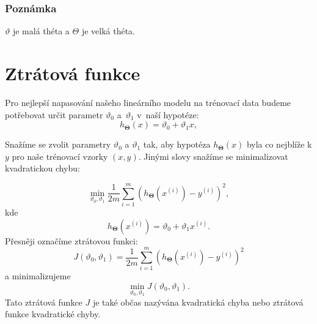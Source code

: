 \subsubsection*{Poznámka}
\par{$\vartheta$ je malá théta a $\Theta$ je velká théta.}

\newpage















\section{Ztrátová funkce}
\label{sec:LinearniRegreseZtratovaFunkce}

\par{Pro nejlepší napasování našeho lineárního modelu na trénovací data budeme potřebovat určit parametr $\vartheta_0$ a~$\vartheta_1$ v~naší hypotéze:
\begin{equation}
	h_{\bm{\Theta}} \left( x \right) = \vartheta_0 + \vartheta_1 x,
\end{equation}}

\par{Snažíme se zvolit parametry $\vartheta_0$ a $\vartheta_1$ tak, aby hypotéza $h_{\bm{\Theta}} \left( x \right)$ byla co nejblíže k $y$ pro naše trénovací vzorky $\left( x, y \right)$. Jinými slovy snažíme se minimalizovat kvadratickou chybu:

\begin{equation}
	\min_{\vartheta_0, \vartheta_1} \frac{1}{2m} \sum_{i = 1}^{m} \left( h_{\bm{\Theta}} \left( x^{\left( i \right)} \right) - y^{\left( i \right)} \right)^2,
\end{equation}
kde
\begin{equation}
	h_{\bm{\Theta}} \left( x^{\left( i \right)} \right) = \vartheta_0 + \vartheta_1 x^{\left( i \right)}.
	\label{eq:hProJednoDato}
\end{equation}
Přesněji označíme ztrátovou funkci:
\begin{equation}
	J \left( \vartheta_0, \vartheta_1 \right) = \frac{1}{2m} \sum_{i = 1}^{m} \left( h_{\bm{\Theta}} \left( x^{\left( i \right)} \right) - y^{\left( i \right)} \right)^2
\end{equation}
a minimalizujeme
\begin{equation}
	\min_{\vartheta_0, \vartheta_1} 	J \left( \vartheta_0, \vartheta_1 \right).
\end{equation}
Tato ztrátová funkce $J$ je také občas nazývána kvadratická chyba nebo ztrátová funkce kvadratické chyby.}

